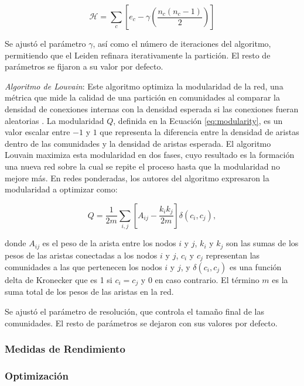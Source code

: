 \begin{equation}
	\label{eq:cpm}
	\mathcal{H} = \sum_{c} \left[ e_c - \gamma \left( \frac{n_c (n_c - 1)}{2} \right) \right]
\end{equation}

\noindent Se ajustó el parámetro \(\gamma\), así como el número de iteraciones del algoritmo, permitiendo que el Leiden refinara iterativamente la partición. El resto de parámetros se fijaron a su valor por defecto. 


\textit{Algoritmo de Louvain}: Este algoritmo optimiza la modularidad de la red, una métrica que mide la calidad de una partición en comunidades al comparar la densidad de conexiones internas con la densidad esperada si las conexiones fueran aleatorias \cite{Blondel2008Louvain}. La modularidad \( Q \), definida en la Ecuación \ref{eq:modularity}, es un valor escalar entre \(-1\) y \(1\) que representa la diferencia entre la densidad de aristas dentro de las comunidades y la densidad de aristas esperada. El algoritmo Louvain maximiza esta modularidad en dos fases, cuyo resultado es la formación una nueva red sobre la cual se repite el proceso hasta que la modularidad no mejore más. En redes ponderadas, los autores del algoritmo expresaron la modularidad a optimizar como:

\begin{equation}
	\label{eq:modularity}
	Q = \frac{1}{2m} \sum_{i,j} \left[ A_{ij} - \frac{k_i k_j}{2m} \right] \delta(c_i, c_j),
\end{equation}

\noindent donde \( A_{ij} \) es el peso de la arista entre los nodos \( i \) y \( j \), \( k_i \) y \( k_j \) son las sumas de los pesos de las aristas conectadas a los nodos \( i \) y \( j \), \( c_i \) y \( c_j \) representan las comunidades a las que pertenecen los nodos \( i \) y \( j \), y \( \delta(c_i, c_j) \) es una función delta de Kronecker que es 1 si \( c_i = c_j \) y 0 en caso contrario. El término \( m \) es la suma total de los pesos de las aristas en la red.

\noindent Se ajustó el parámetro de resolución, que controla el tamaño final de las comunidades. El resto de parámetros se dejaron con sus valores por defecto.

\subsubsection*{Medidas de Rendimiento}

\subsubsection*{Optimización}